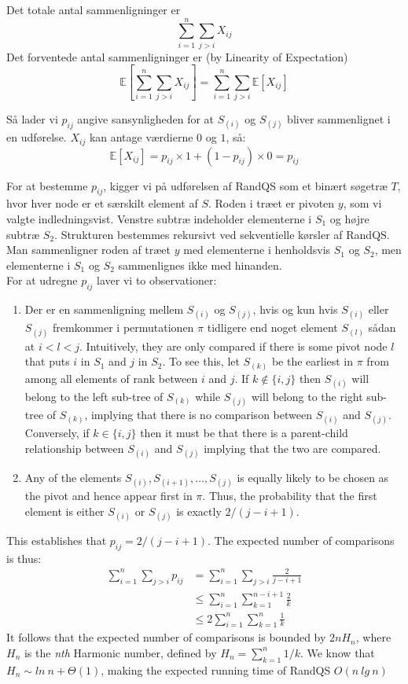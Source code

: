 Det totale antal sammenligninger er 
\[
	\sum_{i=1}^n \sum_{j>i} X_{ij}
\]
Det forventede antal sammenligninger er (by Linearity of Expectation)
\[
	\mathbb{E}[\sum_{i=1}^n \sum_{j>i} X_{ij}] = \sum_{i=1}^n \sum_{j>i} \mathbb{E}[X_{ij}]
\]

Så lader vi $p_{ij}$ angive sansynligheden for at $S_{(i)}$ og $S_{(j)}$ bliver sammenlignet i en udførelse. $X_{ij}$ kan antage værdierne $0$ og $1$, så:
\[
	\mathbb{E}[X_{ij}] = p_{ij} \times 1 + (1 - p_{ij}) \times 0 = p_{ij}
\]

For at bestemme $p_{ij}$, kigger vi på udførelsen af RandQS som et binært søgetræ $T$, hvor hver node er et særskilt element af $S$. Roden i træet er pivoten $y$, som vi valgte indledningsvist. Venstre subtræ indeholder elementerne i $S_1$ og højre subtræ $S_2$. Strukturen bestemmes rekursivt ved sekventielle kørsler af RandQS. Man sammenligner roden af træet $y$ med elementerne i henholdsvis $S_1$ og $S_2$, men elementerne i $S_1$ og $S_2$ sammenlignes ikke med hinanden. \\

For at udregne $p_{ij}$ laver vi to observationer:

\begin{enumerate}
	\item Der er en sammenligning mellem $S_{(i)}$ og $S_{(j)}$, hvis og kun hvis $S_{(i)}$ eller $S_{(j)}$ 
	fremkommer i permutationen $\pi$ tidligere end noget element $S_{(l)}$ sådan at $i < l < j$. Intuitively, 
	they are only compared if there is some pivot node $l$ that puts $i$ in $S_1$ and $j$ in $S_2$. To see 
	this, let $S_{(k)}$ be the earliest in $\pi$ from among all elements of rank between $i$ and $j$. If $k \notin \{i,j\}$
	then $S_{(i)}$ will belong to the left sub-tree of $S_{(k)}$ while $S_{(j)}$ will belong to the right sub-tree
	of $S_{(k)}$, implying that there is no comparison between $S_{(i)}$ and $S_{(j)}$. Conversely, if
	$k \in \{i,j\}$ then it must be that there is a parent-child relationship between $S_{(i)}$ and $S_{(j)}$
	implying that the two are compared.

	\item Any of the elements $S_{(i)}, S_{(i+1)}, \hdots, S_{(j)}$ is equally likely to be chosen as the pivot and
	hence appear first in $\pi$. Thus, the probability that the first element is either $S_{(i)}$ or $S_{(j)}$ is
	exactly $2 / (j - i + 1)$.
\end{enumerate}

This establishes that $p_{ij} = 2/(j - i + 1)$. The expected number of comparisons is thus:
%
\begin{align*}
	\sum_{i=1}^n \sum_{j>i} p_{ij} &= \sum_{i=1}^n \sum_{j>i} \frac{2}{j-i+1} \\
	&\leq \sum_{i=1}^n \sum_{k=1}^{n-i+1} \frac{2}{k} \\
	&\leq 2\sum_{i=1}^n \sum_{k=1}^{n} \frac{1}{k}
\end{align*}
%
It follows that the expected number of comparisons is bounded by $2nH_n$, where $H_n$ is the \textit{nth}
Harmonic number, defined by $H_n = \sum_{k=1}^n 1/k$. We know that $H_n \sim ln\ n + \Theta(1)$, making the expected running time of RandQS $O(n\ lg\ n)$

